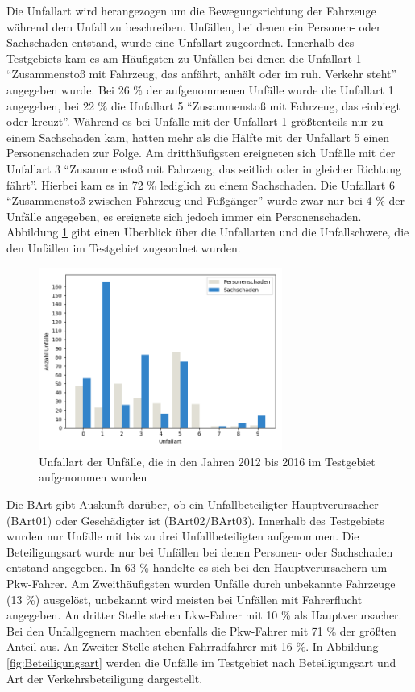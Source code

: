 Die Unfallart wird herangezogen um die Bewegungsrichtung der Fahrzeuge während dem Unfall zu beschreiben. Unfällen, bei denen ein Personen- oder Sachschaden entstand, wurde eine Unfallart zugeordnet. Innerhalb des Testgebiets kam es am Häufigsten zu Unfällen bei denen die Unfallart 1 \enquote{Zusammenstoß mit Fahrzeug, das anfährt, anhält oder im ruh. Verkehr steht} angegeben wurde. Bei 26 \% der aufgenommenen Unfälle wurde die Unfallart 1 angegeben, bei 22 \% die Unfallart 5 \enquote{Zusammenstoß mit Fahrzeug, das einbiegt oder kreuzt}. Während es bei Unfälle mit der Unfallart 1 größtenteils nur zu einem Sachschaden kam, hatten mehr als die Hälfte mit der Unfallart 5 einen Personenschaden zur Folge. Am dritthäufigsten ereigneten sich Unfälle mit der Unfallart 3 \enquote{Zusammenstoß mit Fahrzeug, das seitlich oder in gleicher Richtung fährt}. Hierbei kam es in 72 \% lediglich zu einem Sachschaden. Die Unfallart 6 \enquote{Zusammenstoß zwischen Fahrzeug und Fußgänger} wurde zwar nur bei 4 \% der Unfälle angegeben, es ereignete sich jedoch immer ein Personenschaden. Abbildung \ref{fig:Unfallart} gibt einen Überblick über die Unfallarten und die Unfallschwere, die den Unfällen im Testgebiet zugeordnet wurden.

\begin{savenotes}
	\begin{figure}[H]
		\centering
		\includegraphics[width=8cm,height=6cm]{figures/Unfallart}
		\caption[Unfallart der Unfälle, die in den Jahren 2012 bis 2016 im Testgebiet aufgenommen wurden]{Unfallart der Unfälle, die in den Jahren 2012 bis 2016 im Testgebiet aufgenommen wurden}\label{fig:Unfallart}
	\end{figure}
\end{savenotes}

Die \ac{BArt} gibt Auskunft darüber, ob ein Unfallbeteiligter Hauptverursacher (BArt01) oder Geschädigter ist (BArt02/BArt03). Innerhalb des Testgebiets wurden nur Unfälle mit bis zu drei Unfallbeteiligten aufgenommen. Die Beteiligungsart wurde nur bei Unfällen bei denen Personen- oder Sachschaden entstand angegeben. In 63 \% handelte es sich bei den Hauptverursachern um Pkw-Fahrer. Am Zweithäufigsten wurden Unfälle durch unbekannte Fahrzeuge (13 \%) ausgelöst, unbekannt wird meisten bei Unfällen mit Fahrerflucht angegeben. An dritter Stelle stehen Lkw-Fahrer mit 10 \% als Hauptverursacher. Bei den Unfallgegnern machten ebenfalls die Pkw-Fahrer mit 71 \% der größten Anteil aus. An Zweiter Stelle stehen Fahrradfahrer mit 16 \%. In Abbildung \ref{fig:Beteiligungsart} werden die Unfälle im Testgebiet nach Beteiligungsart und Art der Verkehrsbeteiligung dargestellt. 


